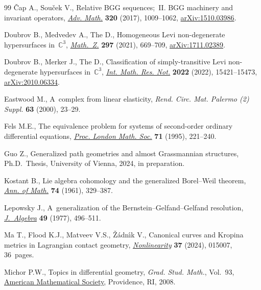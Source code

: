 \begin{thebibliography}{99}
{\v{C}}ap A., Sou\v{c}ek V., Relative {BGG} sequences;~{II}. {BGG} machinery
 and invariant operators, \href{https://doi.org/10.1016/j.aim.2017.09.016}{\textit{Adv. Math.}} \textbf{320} (2017), 1009--1062,
 \href{https://arxiv.org/abs/1510.03986}{arXiv:1510.03986}.

Doubrov B., Medvedev A., The D., Homogeneous {L}evi non-degenerate
 hypersurfaces in~{$\mathbb{C}^3$}, \href{https://doi.org/10.1007/s00209-020-02528-2}{\textit{Math.~Z.}} \textbf{297} (2021),
 669--709, \href{https://arxiv.org/abs/1711.02389}{arXiv:1711.02389}.

Doubrov B., Merker J., The D., Classification of simply-transitive {L}evi
 non-degenerate hypersurfaces in~{$\mathbb{C}^3$}, \href{https://doi.org/10.1093/imrn/rnab147}{\textit{Int. Math. Res.
 Not.}} \textbf{2022} (2022), 15421--15473, \href{https://arxiv.org/abs/2010.06334}{arXiv:2010.06334}.

Eastwood M., A~complex from linear elasticity, \textit{Rend. Circ. Mat. Palermo (2) Suppl.} \textbf{63} (2000), 23--29.

Fels M.E., The equivalence problem for systems of second-order ordinary
 differential equations, \href{https://doi.org/10.1112/plms/s3-71.1.221}{\textit{Proc. London Math. Soc.}} \textbf{71} (1995),
 221--240.

Guo Z., Generalized path geometries and almost {G}rassmannian structures, Ph.D.~Thesis, {U}niversity of Vienna, 2024, in preparation.

Kostant B., Lie algebra cohomology and the generalized {B}orel--{W}eil theorem,
 \href{https://doi.org/10.2307/1970237}{\textit{Ann. of Math.}} \textbf{74} (1961), 329--387.

Lepowsky J., A~generalization of the {B}ernstein--{G}elfand--{G}elfand
 resolution, \href{https://doi.org/10.1016/0021-8693(77)90254-X}{\textit{J.~Algebra}} \textbf{49} (1977), 496--511.

Ma T., Flood K.J., Matveev V.S., \v{Z}\'adn\'{\i}k V., Canonical curves and
 {K}ropina metrics in {L}agrangian contact geometry, \href{https://doi.org/10.1088/1361-6544/ad0c2b}{\textit{Nonlinearity}}
 \textbf{37} (2024), 015007, 36~pages.

Michor P.W., Topics in differential geometry, \textit{Grad. Stud. Math.},
 Vol.~93, \href{https://doi.org/10.1090/gsm/093}{American Mathematical Society}, Providence, RI, 2008.


\end{thebibliography}
